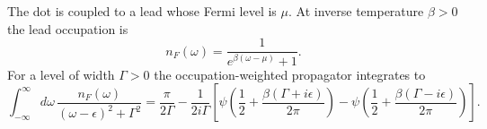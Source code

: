 \documentclass{article}
\begin{document}
The dot is coupled to a lead whose Fermi level is $\mu$. At inverse temperature $\beta>0$ the lead occupation is
\begin{equation}
n_F(\omega) = \frac{1}{e^{\beta(\omega-\mu)}+1} .
\label{eq:nf}
\end{equation}
For a level of width $\Gamma>0$ the occupation-weighted propagator integrates to
\begin{equation}
\int_{-\infty}^{\infty} d\omega\, \frac{n_F(\omega)}{(\omega-\epsilon)^2+\Gamma^2} = \frac{\pi}{2\Gamma} - \frac{1}{2i\Gamma}\left[\psi\left(\frac{1}{2}+\frac{\beta(\Gamma+i\epsilon)}{2\pi}\right)-\psi\left(\frac{1}{2}+\frac{\beta(\Gamma-i\epsilon)}{2\pi}\right)\right] .
\label{eq:occ}
\end{equation}
\end{document}
